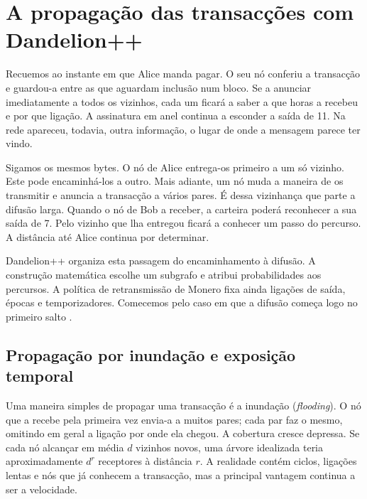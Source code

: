 \chapter{A propagação das transacções com Dandelion++}
\label{chapter:dandelion}
\label{page:dandelion-start}

Recuemos ao instante em que Alice manda pagar. O seu nó conferiu a
transacção e guardou-a entre as que aguardam inclusão num bloco. Se
a anunciar imediatamente a todos os vizinhos, cada um ficará a saber
a que horas a recebeu e por que ligação. A assinatura em anel continua
a esconder a saída de 11. Na rede apareceu, todavia, outra informação,
o lugar de onde a mensagem parece ter vindo.

Sigamos os mesmos bytes. O nó de Alice entrega-os primeiro a um só
vizinho. Este pode encaminhá-los a outro. Mais adiante, um nó muda
a maneira de os transmitir e anuncia a transacção a vários pares.
É dessa vizinhança que parte a difusão larga. Quando o nó de Bob a receber,
a carteira poderá reconhecer a sua saída de 7. Pelo vizinho que lha
entregou ficará a conhecer um passo do percurso. A distância até Alice
continua por determinar.

Dandelion++ organiza esta passagem do encaminhamento à difusão. A
construção matemática escolhe um subgrafo e atribui probabilidades
aos percursos. A política de retransmissão de Monero fixa ainda
ligações de saída, épocas e temporizadores. Comecemos pelo caso em
que a difusão começa logo no primeiro salto
\cite{dandelion-plus-plus,monero-source-v16}.

\section{Propagação por inundação e exposição temporal}
\label{sec:dandelion-flooding}

Uma maneira simples de propagar uma transacção é a inundação
(\emph{flooding}). O nó que a recebe pela primeira vez envia-a a muitos
pares; cada par faz o mesmo, omitindo em geral a ligação por onde ela
chegou. A cobertura cresce depressa. Se cada nó alcançar em média \(d\)
vizinhos novos, uma árvore idealizada teria aproximadamente \(d^r\) receptores
à distância \(r\). A realidade contém ciclos, ligações lentas e nós que já
conhecem a transacção, mas a principal vantagem continua a ser a velocidade.

